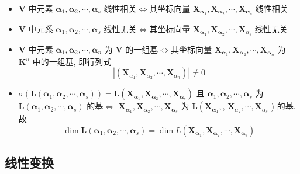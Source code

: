 \documentclass{article}
\begin{document}
				\begin{itemize}
					\item $\boldsymbol V$ 中元素 $\boldsymbol{\alpha}_{1}, \boldsymbol{\alpha}_{2}, \cdots, \boldsymbol{\alpha}_{s}$ 线性相关$\Leftrightarrow$其坐标向量 $\boldsymbol{X}_{\boldsymbol{\alpha}_{1}}, \boldsymbol{X}_{\boldsymbol{\alpha}_{2}}, \cdots, \boldsymbol{X}_{\boldsymbol{\alpha}_{s}}$ 线性相关
					\item $\boldsymbol V$ 中元系 $\boldsymbol{\alpha}_{1}, \boldsymbol{\alpha}_{2}, \cdots, \boldsymbol{\alpha}_{s}$ 线性无关$\Leftrightarrow$其坐标向量 $\boldsymbol{X}_{\boldsymbol{\alpha}_{1}}, \boldsymbol{X}_{\boldsymbol{\alpha}_{2}}, \cdots, \boldsymbol{X}_{\alpha_{s}}$ 线性无关
					\item $\boldsymbol V$ 中元素 $\boldsymbol{\alpha}_{1}, \boldsymbol{\alpha}_{2}, \cdots, \boldsymbol{\alpha}_{n}$ 为 $\boldsymbol V$ 的一组基$\Leftrightarrow$其坐标向量 $\boldsymbol{X}_{\boldsymbol{\alpha}_{1}}, \boldsymbol{X}_{\boldsymbol{\alpha}_{2}}, \cdots, \boldsymbol{X}_{\boldsymbol{\alpha}_{n}}$ 为 $\mathbf K^{n}$ 中的一组基, 即行列式
					$$
					\left|\left(\boldsymbol{X}_{\alpha_{1}}, \boldsymbol{X}_{\alpha_{2}}, \cdots, 	\boldsymbol{X}_{\alpha_{n}}\right)\right| \neq 0
					$$
					\item $\sigma\left(\boldsymbol L\left(\boldsymbol{\alpha}_{1}, \boldsymbol{\alpha}_{2}, \cdots, \boldsymbol{\alpha}_{s}\right)\right)=\boldsymbol L\left(\boldsymbol{X}_{\boldsymbol{\alpha}_{1}}, \boldsymbol{X}_{\boldsymbol{\alpha}_{2}}, \cdots, \boldsymbol{X}_{\boldsymbol{\alpha}_{s}}\right)$ 且 $\boldsymbol{\alpha}_{1}, \boldsymbol{\alpha}_{2}, \cdots, \boldsymbol{\alpha}_{s}$ 为 $\boldsymbol L\left(\boldsymbol{\alpha}_{1}, \boldsymbol{\alpha}_{2}, \cdots, \boldsymbol{\alpha}_{s}\right)$ 的基$\Leftrightarrow$ $\boldsymbol{X}_{\boldsymbol{\alpha}_{1}}, \boldsymbol{X}_{\boldsymbol{\alpha}_{2}}, \cdots, \boldsymbol{X}_{\boldsymbol{\alpha}_{s}}$ 为 $\boldsymbol L\left(\boldsymbol{X}_{\boldsymbol{\alpha}_{1}},\right.$, $\boldsymbol{X}_{\alpha_{2}}, \cdots, \boldsymbol{X}_{\alpha_{s}}$ ) 的基. 故
					$$
					\operatorname{dim} \boldsymbol L\left(\boldsymbol{\alpha}_{1}, \boldsymbol{\alpha}_{2}, \cdots, 	\boldsymbol{\alpha}_{s}\right)=\operatorname{dim} L\left(\boldsymbol{X}_{\boldsymbol{\alpha}_{1}}, \boldsymbol{X}_{\boldsymbol{\alpha}_{2}}, \cdots, \boldsymbol{X}_{\boldsymbol{\alpha}_{s}}\right)
					$$
				\end{itemize}
		\subsection{线性变换}
\end{document}
